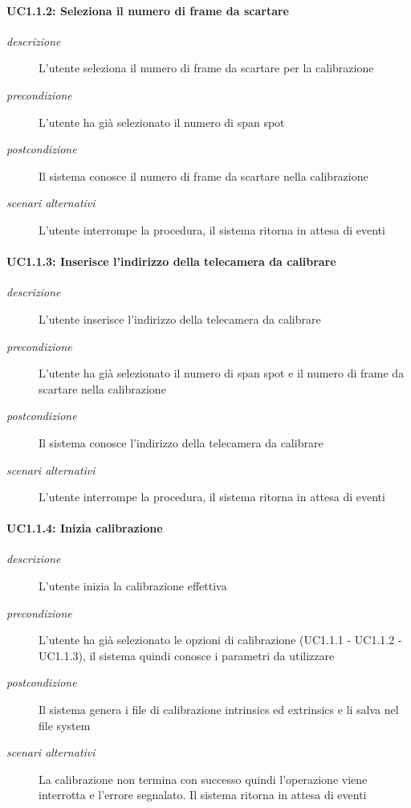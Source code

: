 \paragraph{UC1.1.2: Seleziona il numero di frame da scartare}
\begin{description}
 \item[\em{descrizione}] L'utente seleziona il numero di frame da scartare per la calibrazione
 \item[\em{precondizione}] L'utente ha già selezionato il numero di span spot
 \item[\em{postcondizione}] Il sistema conosce il numero di frame da scartare nella calibrazione
  \item[\em{scenari alternativi}] L'utente interrompe la procedura, il sistema ritorna in attesa di eventi
 \end{description}

\paragraph{UC1.1.3: Inserisce l'indirizzo della telecamera da calibrare}
\begin{description}
 \item[\em{descrizione}] L'utente inserisce l'indirizzo della telecamera da calibrare
 \item[\em{precondizione}] L'utente ha già selezionato il numero di span spot e il numero di frame da scartare nella calibrazione
 \item[\em{postcondizione}] Il sistema conosce l'indirizzo della telecamera da calibrare
  \item[\em{scenari alternativi}] L'utente interrompe la procedura, il sistema ritorna in attesa di eventi
 \end{description}

\paragraph{UC1.1.4: Inizia calibrazione}
\begin{description}
 \item[\em{descrizione}] L'utente inizia la calibrazione effettiva
 \item[\em{precondizione}] L'utente ha già selezionato le opzioni di calibrazione (UC1.1.1 - UC1.1.2 - UC1.1.3), il sistema quindi conosce i parametri da utilizzare
 \item[\em{postcondizione}] Il sistema genera i file di calibrazione intrinsics ed extrinsics e li salva nel file system
  \item[\em{scenari alternativi}] La calibrazione non termina con successo quindi l'operazione viene interrotta e l'errore segnalato. Il sistema ritorna in attesa di eventi
 \end{description}


